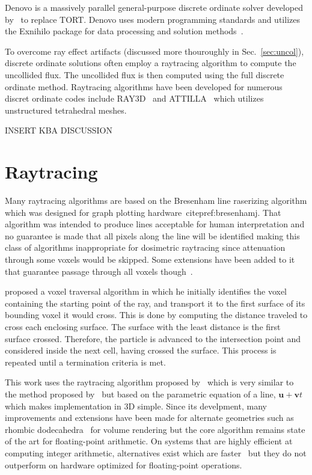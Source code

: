 Denovo is a massively parallel general-purpose discrete ordinate solver developed by~\citet{ref:evanst} to replace TORT. Denovo uses modern programming standards and utilizes the Exnihilo package for data processing and solution methods~\citep{ref:evanst2}. 

To overcome ray effect artifacts (discussed more thouroughly in Sec.~\ref{sec:uncol}), discrete ordinate solutions often employ a raytracing algorithm to compute the uncollided flux. The uncollided flux is then computed using the full discrete ordinate method. Raytracing algorithms have been developed for numerous discret ordinate codes include RAY3D~\citep{ref:yingz} and ATTILLA~\citep{ref:wareingt} which utilizes unstructured tetrahedral meshes.

INSERT KBA DISCUSSION

\section{Raytracing}

Many raytracing algorithms are based on the Bresenham line raserizing algorithm which was designed for graph plotting hardware~citep{ref:bresenhamj}. That algorithm was intended to produce lines acceptable for human interpretation and no guarantee is made that all pixels along the line will be identified making this class of algorithms inappropriate for dosimetric raytracing since attenuation through some voxels would be skipped. Some extensions have been added to it that guarantee passage through all voxels though~\citep{ref:liuy}.

\citet{ref:clearyj} proposed a voxel traversal algorithm in which he initially identifies the voxel containing the starting point of the ray, and transport it to the first surface of its bounding voxel it would cross. This is done by computing the distance traveled to cross each enclosing surface. The surface with the least distance is the first surface crossed. Therefore, the particle is advanced to the intersection point and considered inside the next cell, having crossed the surface. This process is repeated until a termination criteria is met.

This work uses the raytracing algorithm proposed by~\citet{ref:wooa} which is very similar to the method proposed by~\citet{ref:clearyj} but based on the parametric equation of a line, $\boldsymbol{u} + \boldsymbol{v}t$ which makes implementation in 3D simple. Since its develpment, many improvements and extensions have been made for alternate geometries such as rhombic dodecahedra~\citep{ref:hel} for volume rendering but the core algorithm remains state of the art for floating-point arithmetic. On systems that are highly efficient at computing integer arithmetic, alternatives exist which are faster~\citep{ref:liuy} but they do not outperform on hardware optimized for floating-point operations.

